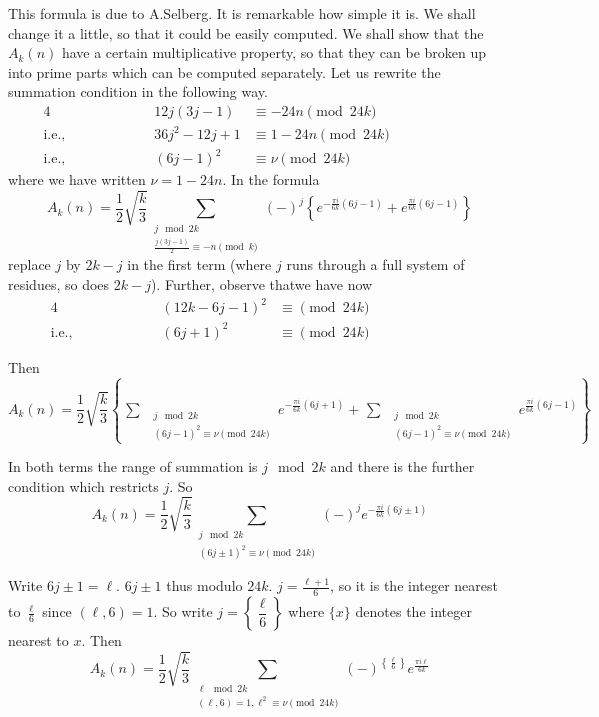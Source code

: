 This formula is due to A.Selberg. It is remarkable how simple it
is. We shall change it a little, so that it could be easily
computed. We shall show that the $A_k(n)$ have a certain
multiplicative property, so that they can be broken up into prime
parts which can be computed separately. Let us rewrite the summation
condition in the following way.
\begin{alignat*}{4}
  &\hspace{2cm}& 12 j (3j-1) & \equiv -24 n \pmod{24 k}\hspace{3cm}\\
  \text{i.e.,} && 36j^2 - 12 j + 1 & \equiv 1 - 24 n \pmod{24 k}\\
  \text{i.e.,} && (6 j-1)^2 & \equiv \nu \pmod{24 k}
\end{alignat*}
where we have written $\nu=1- 24n$. In the formula
$$
A_k (n) = \frac{1}{2} \sqrt{\frac{k}{3}} \sum_{\substack{j \mod
      2k\\\frac{j(3j-1)}{2} \equiv -n \pmod{k}}} (-)^j \left\{
e^{-\frac{\pi i}{6k} (6 j-1)} + e^{\frac{\pi i}{6k}(6 j-1) } \right\}
$$
replace $j$ by $2k-j$ in the first term (where $j$ runs through a
full system of residues, so does $2k-j$). Further, observe
that\pageoriginale we have now
\begin{alignat*}{4}
  && (12 k - 6j-1)^2 & \equiv \pmod{24 k}\\
  \text{i.e.,} & \hspace{2cm} & (6j+1)^2 & \equiv \pmod{24 k} \hspace{3cm}
\end{alignat*}

Then 
$$
  A_k (n) = \frac{1}{2} \sqrt{\frac{k}{3}} \left\{ \mathop{\sum
    ~~(-)^j}_{\substack{j \mod 2k\\ (6j-1)^2 \equiv \nu \pmod{ 24 k}}} 
  e^{-\frac{\pi i}{6k} (6 j+1)}
  + \mathop{\sum ~~(-)^j}_{\substack{j \mod
      2k\\ (6j-1)^2 \equiv \nu \pmod{ 24 k}}}  e^{\frac{\pi
      i}{6k}(6 j-1)}  \right\}
$$

In both terms the range of summation is $j \mod 2k$ and there is the
further condition which restricts $j$. So
$$
  A_k (n) = \frac{1}{2} \sqrt{\frac{k}{3}} \sum
    _{\substack{j \mod 2k\\ (6j\pm 1)^2 \equiv \nu \pmod{ 24 k}}}(-)^j 
  e^{-\frac{\pi i}{6k} (6 j\pm 1)}
$$ 

Write $6j \pm 1= \ell$. $6 j \pm 1$ thus modulo $24 k$. $j= \frac{\ell
  +1}{6}$, so it is the integer nearest to $\frac{\ell}{6}$ since
$(\ell, 6)=1$. So write $j= \left\{ \dfrac{\ell}{6} \right\}$ where
$\{ x\}$ denotes the integer nearest to $x$. Then
$$
  A_k (n) = \frac{1}{2} \sqrt{\frac{k}{3}} \sum 
    _{\substack{\ell  \mod 2k\\ (\ell, 6)=1, \ell^2 \equiv \nu \pmod{
        24 k}}}(-)^{\left\{ \frac{\ell}{6}\right\}} e^{\frac{\pi i \ell}{6k}} 
$$ 

